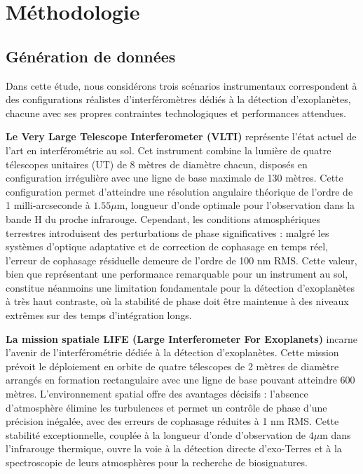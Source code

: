 \documentclass{article}
\begin{document}
\section{Méthodologie}



\subsection{Génération de données}

Dans cette étude, nous considérons trois scénarios instrumentaux correspondent à des configurations réalistes d'interféromètres dédiés à la détection d'exoplanètes, chacune avec ses propres contraintes technologiques et performances attendues.

\textbf{Le Very Large Telescope Interferometer (VLTI)} représente l'état actuel de l'art en interférométrie au sol. Cet instrument combine la lumière de quatre télescopes unitaires (UT) de 8 mètres de diamètre chacun, disposés en configuration irrégulière avec une ligne de base maximale de 130 mètres. Cette configuration permet d'atteindre une résolution angulaire théorique de l'ordre de 1 milli-arcseconde à $1.55\mu$m, longueur d'onde optimale pour l'observation dans la bande H du proche infrarouge. Cependant, les conditions atmosphériques terrestres introduisent des perturbations de phase significatives : malgré les systèmes d'optique adaptative et de correction de cophasage en temps réel, l'erreur de cophasage résiduelle demeure de l'ordre de 100 nm RMS. Cette valeur, bien que représentant une performance remarquable pour un instrument au sol, constitue néanmoins une limitation fondamentale pour la détection d'exoplanètes à très haut contraste, où la stabilité de phase doit être maintenue à des niveaux extrêmes sur des temps d'intégration longs.

\textbf{La mission spatiale LIFE (Large Interferometer For Exoplanets)} incarne l'avenir de l'interférométrie dédiée à la détection d'exoplanètes. Cette mission prévoit le déploiement en orbite de quatre télescopes de 2 mètres de diamètre arrangés en formation rectangulaire avec une ligne de base pouvant atteindre 600 mètres. L'environnement spatial offre des avantages décisifs : l'absence d'atmosphère élimine les turbulences et permet un contrôle de phase d'une précision inégalée, avec des erreurs de cophasage réduites à 1 nm RMS. Cette stabilité exceptionnelle, couplée à la longueur d'onde d'observation de $4\mu$m dans l'infrarouge thermique, ouvre la voie à la détection directe d'exo-Terres et à la spectroscopie de leurs atmosphères pour la recherche de biosignatures.
\end{document}
